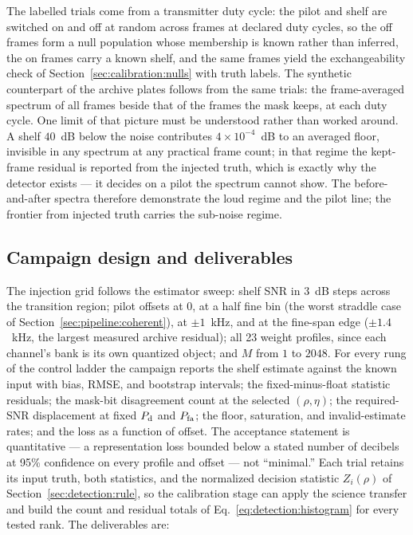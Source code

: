 The labelled trials come from a transmitter duty cycle: the pilot and shelf are switched on and off at random across frames at declared duty cycles, so the off frames form a null population whose membership is known rather than inferred, the on frames carry a known shelf, and the same frames yield the exchangeability check of Section~\ref{sec:calibration:nulls} with truth labels. The synthetic counterpart of the archive plates follows from the same trials: the frame-averaged spectrum of all frames beside that of the frames the mask keeps, at each duty cycle. One limit of that picture must be understood rather than worked around. A shelf $40$~dB below the noise contributes $4\times10^{-4}$~dB to an averaged floor, invisible in any spectrum at any practical frame count; in that regime the kept-frame residual is reported from the injected truth, which is exactly why the detector exists --- it decides on a pilot the spectrum cannot show. The before-and-after spectra therefore demonstrate the loud regime and the pilot line; the frontier from injected truth carries the sub-noise regime.

\subsection*{Campaign design and deliverables}

The injection grid follows the estimator sweep: shelf SNR in $3$~dB steps across the transition region; pilot offsets at $0$, at a half fine bin (the worst straddle case of Section~\ref{sec:pipeline:coherent}), at $\pm 1$~kHz, and at the fine-span edge ($\pm 1.4$~kHz, the largest measured archive residual); all 23 weight profiles, since each channel's bank is its own quantized object; and $M$ from $1$ to $2048$. For every rung of the control ladder the campaign reports the shelf estimate against the known input with bias, RMSE, and bootstrap intervals; the fixed-minus-float statistic residuals; the mask-bit disagreement count at the selected $(\rho,\eta)$; the required-SNR displacement at fixed $P_{\rm d}$ and $P_{\rm fa}$; the floor, saturation, and invalid-estimate rates; and the loss as a function of offset. The acceptance statement is quantitative --- a representation loss bounded below a stated number of decibels at 95\% confidence on every profile and offset --- not ``minimal.'' Each trial retains its input truth, both statistics, and the normalized decision statistic $Z_i(\rho)$ of Section~\ref{sec:detection:rule}, so the calibration stage can apply the science transfer and build the count and residual totals of Eq.~\eqref{eq:detection:histogram} for every tested rank. The deliverables are:

